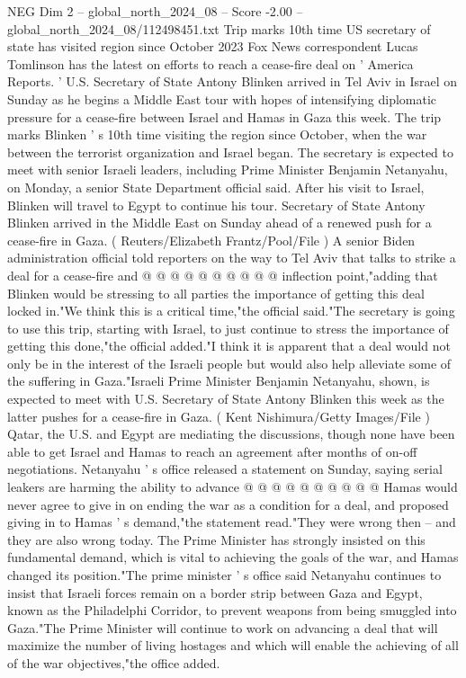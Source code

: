 \begin{textsample}{NEG Dim 2 – global\_north\_2024\_08 – Score -2.00 – global\_north\_2024\_08/112498451.txt}  \label{ex:f2_neg_049}
Trip marks 10th time US secretary of state has visited region since October 2023 Fox News correspondent Lucas Tomlinson has the latest on efforts to reach a cease-fire deal on ' America Reports. ' U.S.
Secretary of State Antony Blinken arrived in Tel Aviv in Israel on Sunday as he begins a Middle East tour with hopes of intensifying diplomatic pressure for a cease-fire between Israel and Hamas in Gaza this week.
The trip marks Blinken ' s 10th time visiting the region since October, when the war between the terrorist organization and Israel began.
The secretary is expected to meet with senior Israeli leaders, including Prime Minister Benjamin Netanyahu, on Monday, a senior State Department official said.
After his visit to Israel, Blinken will travel to Egypt to continue his tour.
Secretary of State Antony Blinken arrived in the Middle East on Sunday ahead of a renewed push for a cease-fire in Gaza. ( Reuters/Elizabeth Frantz/Pool/File ) A senior Biden administration official told reporters on the way to Tel Aviv that talks to strike a deal for a cease-fire and @ @ @ @ @ @ @ @ @ @ inflection point,"adding that Blinken would be stressing to all parties the importance of getting this deal locked in."We think this is a critical time,"the official said."The secretary is going to use this trip, starting with Israel, to just continue to stress the importance of getting this done,"the official added."I think it is apparent that a deal would not only be in the interest of the Israeli people but would also help alleviate some of the suffering in Gaza."Israeli Prime Minister Benjamin Netanyahu, shown, is expected to meet with U.S.
Secretary of State Antony Blinken this week as the latter pushes for a cease-fire in Gaza. ( Kent Nishimura/Getty Images/File ) Qatar, the U.S. and Egypt are mediating the discussions, though none have been able to get Israel and Hamas to reach an agreement after months of on-off negotiations.
Netanyahu ' s office released a statement on Sunday, saying serial leakers are harming the ability to advance @ @ @ @ @ @ @ @ @ @ Hamas would never agree to give in on ending the war as a condition for a deal, and proposed giving in to Hamas ' s demand,"the statement read."They were wrong then -- and they are also wrong today.
The Prime Minister has strongly insisted on this fundamental demand, which is vital to achieving the goals of the war, and Hamas changed its position."The prime minister ' s office said Netanyahu continues to insist that Israeli forces remain on a border strip between Gaza and Egypt, known as the Philadelphi Corridor, to prevent weapons from being smuggled into Gaza."The Prime Minister will continue to work on advancing a deal that will maximize the number of living hostages and which will enable the achieving of all of the war objectives,"the office added.

\end{textsample}
